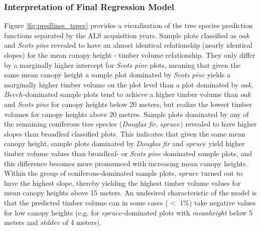 

\subsubsection*{Interpretation of Final Regression Model}
\label{sec:prop_regmod_final}
Figure \ref{fig:predlines_tspec} provides a visualisation of the tree species prediction functions separated by the ALS acquisition years. Sample plots classified as $oak$ and \textit{Scots pine} revealed to have an almost identical relationship (nearly identical slopes) for the mean canopy height - timber volume relationship. They only differ by a marginally higher intercept for \textit{Scots pine} plots, meaning that given the same mean canopy height a sample plot dominated by \textit{Scots pine} yields a marginally higher timber volume on the plot level than a plot dominated by $oak$. $Beech$-dominated sample plots tend to achieve a higher timber volume than $oak$ and \textit{Scots pine} for canopy heights below 20 meters, but realize the lowest timber volumes for canopy heights above 20 metres. Sample plots dominated by any of the remaining coniferous tree species (\textit{Douglas fir}, $spruce$) revealed to have higher slopes than broadleaf classified plots. This indicates that given the same mean canopy height, sample plots dominated by \textit{Douglas fir} and $spruce$ yield higher timber volume values than broadleaf- or \textit{Scots pine} dominated sample plots, and this difference becomes more pronounced with increasing mean canopy heights. Within the group of coniferous-dominated sample plots, $spruce$ turned out to have the highest slope, thereby yielding the highest timber volume values for mean canopy heights above 15 meters. An undesired characteristic of the model is that the predicted timber volume can in some cases ($<$ 1\%) take negative values for low canopy heights (e.g. for $spruce$-dominated plots with \textit{meanheight} below 5 meters and $stddev$ of 4 meters). 


